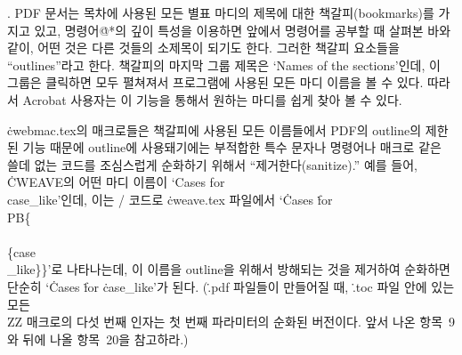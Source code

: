 {%
. {\mc PDF} 문서는 목차에 사용된 모든 별표 마디의 제목에 대한
책갈피(bookmarks)를 가지고 있고, 명령어\.{@*}의 깊이 특성을 이용하면
앞에서 명령어를 공부할 때 살펴본 바와 같이, 어떤 것은 다른 것들의
소제목이 되기도 한다. 그러한 책갈피 요소들을 
``outlines''라고 한다. 책갈피의 마지막 그룹 제목은 `Names of the
sections'인데, 이 그룹은 클릭하면 모두 펼쳐져서 프로그램에 사용된 모든
마디 이름을 볼 수 있다. 따라서 Acrobat 사용자는 이 기능을 통해서
원하는 마디를 쉽게 찾아 볼 수 있다. 

\.{cwebmac.tex}의 매크로들은 책갈피에
사용된 모든 이름들에서 {\mc PDF}의 outline의 제한된 기능 때문에
outline에 사용돼기에는 부적합한 특수 문자나 명령어나 매크로 같은 쓸데%
없는 코드를 조심스럽게 순화하기 위해서 ``제거한다(sanitize).'' 예를 들어, \.{CWEAVE}의
어떤 마디 이름이 `Cases for \\{case\_like}'인데, 이는 \TEX/ 코드로
\.{cweave.tex} 파일에서 `\.{Cases} \.{for}
\.{\\PB\{\\\\\{case\\\_like\}\}}'로 나타나는데, 이 이름을 outline을
위해서 방해되는 것을 제거하여 순화하면 단순히
`\.{Cases} \.{for} \.{case\_like}'가 된다. 
(\.{.pdf} 파일들이 만들어질 때, \.{.toc} 파일 안에 있는 모든 \.{\\ZZ}
매크로의 다섯 번째 인자는 첫 번째 파라미터의 순화된 버전이다. 앞서 나온
항목~9와 뒤에 나올 항목~20을 참고하라.)

}
